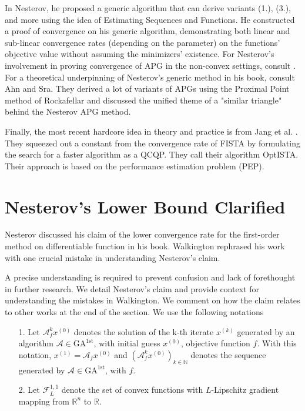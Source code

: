\documentclass[]{article}
\theoremstyle{definition}
\numberwithin{equation}{subsection}
\begin{document}
        In Nesterov\cite{nesterov_lecture_2018}, he proposed a generic algorithm that can derive variants (1.), (3.), and more using the idea of Estimating Sequences and Functions. 
        He constructed a proof of convergence on his generic algorithm, demonstrating both linear and sub-linear convergence rates (depending on the parameter) on the functions' objective value without assuming the minimizers' existence. 
        For Nesterov's involvement in proving convergence of APG in the non-convex settings, consult \cite{necoara_linear_2019}. 
        For a theoretical underpinning of Nesterov's generic method in his book, consult Ahn and Sra\cite{ahn_understanding_2022}. 
        They derived a lot of variants of APGs using the Proximal Point method of Rockafellar and discussed the unified theme of a "similar triangle" behind the Nesterov APG method. 
        \par
        Finally, the most recent hardcore idea in theory and practice is from Jang et al. \cite{jang_computer-assisted_2023}. 
        They squeezed out a constant from the convergence rate of FISTA by formulating the search for a faster algorithm as a QCQP. 
        They call their algorithm OptISTA. 
        Their approach is based on the performance estimation problem (PEP). 


\section{Nesterov's Lower Bound Clarified}\label{sec:optimal_lower_bound}
    Nesterov discussed his claim of the lower convergence rate for the first-order method on differentiable function in his book\cite{nesterov_lectures_2018}. 
    Walkington\cite{noel_nesterovs_nodate} rephrased his work with one crucial mistake in understanding Nesterov's claim. 
    \par
    A precise understanding is required to prevent confusion and lack of forethought in further research.
    We detail Nesterov's claim and provide context for understanding the mistakes in Walkington. 
    We comment on how the claim relates to other works at the end of the section. 
    \newcommand*{\GAfirst}{\text{GA}^{\text{1st}}} %
    We use the following notations
    \begin{itemize}
        \item [1.] Let $\mathcal A^k_fx^{(0)}$ denotes the solution of the k-th iterate $x^{(k)}$ generated by an algorithm $\mathcal A \in \GAfirst$, with initial guess $x^{(0)}$, objective function $f$. 
        With this notation, $x^{(1)} = \mathcal A_f x^{(0)}$ and $(\mathcal A_f^{k}x^{(0)})_{k \in \mathbb N}$ denotes the sequence generated by $\mathcal A \in \GAfirst$, with $f$.
        \item [2.] Let $\mathcal F^{1, 1}_L$ denote the set of convex functions with $L$-Lipschitz gradient mapping from $\mathbb R^n$ to $\mathbb R$. 
    \end{itemize}
\end{document}
